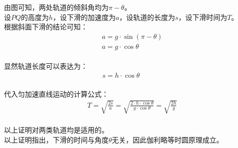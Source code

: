 \documentclass[UTF8]{ctexart}
\begin{document}
    由图可知，两处轨道的倾斜角均为$\pi-\theta$。\\[3mm]
    设$PQ$的高度为$h$，设下滑的加速度为$a$，设轨道的长度为$s$，设下滑时间为$T$。\\[3mm]
    根据斜面下滑的结论可知：
    \begin{align}
        &a=g\cdot\sin{(\pi-\theta)}\\[2mm]
        &a=g\cdot\cos{\theta}
    \end{align}\\
    显然轨道长度可以表达为：
    \begin{align}
        s=h\cdot\cos{\theta}~~~~~~~~~~~
    \end{align}\\
    代入匀加速直线运动的计算公式：
    \begin{align}
        &T=\sqrt{\frac{2s}{a}}=\sqrt{\frac{2\cdot h\cdot \cos{\theta}}{g\cdot\cos{\theta}}}=\sqrt{\frac{2h}{g}}
    \end{align}\\
    以上证明对两类轨道均是适用的。\\[3mm]
    以上证明指出，下滑的时间与角度$\theta$无关，因此伽利略等时圆原理成立。

\newpage
\end{document}
